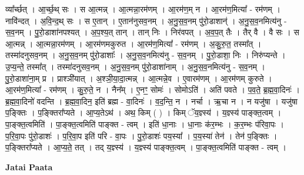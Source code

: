 \documentclass[17pt]{extarticle}
\begin{document}
व्या᳚र्च्छत् । आ॒र्च्छ॒थ् सः । स आ॒त्मन्न् । आ॒त्मन्ना॒रम॑णम् । आ॒रम॑ण॒म् न । आ॒रम॑ण॒मित्या᳚ - रम॑णम् । नावि॑न्दत् । अ॒वि॒न्द॒थ् सः । स ए॒तान् । ए॒तान॑नुसव॒नम् । अ॒नु॒स॒व॒नम् पु॑रो॒डाशान्॑ । अ॒नु॒स॒व॒नमित्य॑नु - स॒व॒नम् । पु॒रो॒डाशा॑नपश्यत् । अ॒प॒श्य॒त् तान् । तान् निः । निर॑वपत् । अ॒व॒प॒त् तैः । तैर् वै । वै सः । स आ॒त्मन्न् । आ॒त्मन्ना॒रम॑णम् । आ॒रम॑णमकुरुत । आ॒रम॑ण॒मित्या᳚ - रम॑णम् । अ॒कु॒रु॒त॒ तस्मा᳚त् । तस्मा॑दनुसव॒नम् । अ॒नु॒स॒व॒नम् पु॑रो॒डाशाः᳚ । अ॒नु॒स॒व॒नमित्य॑नु - स॒व॒नम् । पु॒रो॒डाशा॒ निः । निरु॑प्यन्ते । उ॒प्य॒न्ते॒ तस्मा᳚त् । तस्मा॑दनुसव॒नम् । अ॒नु॒स॒व॒नम् पु॑रो॒डाशा॑नाम् । अ॒नु॒स॒व॒नमित्य॑नु - स॒व॒नम् । पु॒रो॒डाशा॑ना॒म् प्र । प्राश्ञी॑यात् । अ॒श्ञी॒या॒दा॒त्मन्न् । आ॒त्मन्ने॒व । ए॒वारम॑णम् । आ॒रम॑णम् कुरुते । आ॒रम॑ण॒मित्या᳚ - रम॑णम् । कु॒रु॒ते॒ न । नैन᳚म् । ए॒नꣳ॒॒ सोमः॑ । सोमोऽति॑ । अति॑ पवते । प॒व॒ते॒ ब्र॒ह्म॒वा॒दिनः॑ । ब्र॒ह्म॒वा॒दिनो॑ वदन्ति । ब्र॒ह्म॒वा॒दिन॒ इति॑ ब्रह्म - वा॒दिनः॑ । व॒द॒न्ति॒ न । नर्चा । ऋ॒चा न । न यजु॑षा । यजु॑षा प॒ङ्‍क्तिः । प॒ङ्‍क्तिरा᳚प्यते । आ॒प्य॒तेऽथ॑ । अथ॒ किम् ( ) । किम् ॅय॒ज्ञ्स्य॑ । य॒ज्ञ्स्य॑ पाङ्‍क्त॒त्वम् । पा॒ङ्‍क्त॒त्वमिति॑ । पा॒ङ्‍क्त॒त्वमिति॑ पाङ्‍क्त - त्वम् । इति॑ धा॒नाः । धा॒नाः क॑र॒म्भः । क॒र॒म्भः प॑रिवा॒पः । प॒रि॒वा॒पः पु॑रो॒डाशः॑ । प॒रि॒वा॒प इति॑ परि - वा॒पः । पु॒रो॒डाशः॑ पय॒स्या᳚ । प॒य॒स्या॑ तेन॑ । तेन॑ प॒ङ्‍क्तिः । प॒ङ्‍क्तिरा᳚प्यते । आ॒प्य॒ते॒ तत् । तद् य॒ज्ञ्स्य॑ । य॒ज्ञ्स्य॑ पाङ्‍क्त॒त्वम् । पा॒ङ्‍क्त॒त्वमिति॑ पाङ्‍क्त - त्वम् । \newline

\textbf{Jatai Paata} \newline
\end{document}
